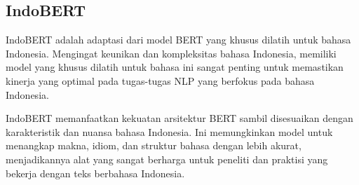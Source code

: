 \subsection{IndoBERT}

IndoBERT adalah adaptasi dari model BERT yang khusus dilatih untuk bahasa Indonesia. Mengingat keunikan dan kompleksitas bahasa Indonesia, memiliki model yang khusus dilatih untuk bahasa ini sangat penting untuk memastikan kinerja yang optimal pada tugas-tugas NLP yang berfokus pada bahasa Indonesia.

IndoBERT memanfaatkan kekuatan arsitektur BERT sambil disesuaikan dengan karakteristik dan nuansa bahasa Indonesia. Ini memungkinkan model untuk menangkap makna, idiom, dan struktur bahasa dengan lebih akurat, menjadikannya alat yang sangat berharga untuk peneliti dan praktisi yang bekerja dengan teks berbahasa Indonesia.
